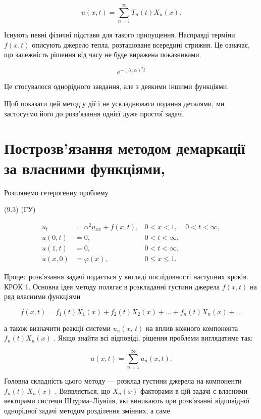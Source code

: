 \documentclass[
  ukrainian,
]{article}
\begin{document}
\[
u(x, t) = \sum_{n=1}^{\infty} T_n(t) X_n(x).
\]

Існують певні фізичні підстави для такого припущення. Насправді терміни
\(f(x,t)\) описують джерело тепла, розташоване всередині стрижня. Це
означає, що залежність рішення від часу не буде виражена показниками.

\[
e^{-(\lambda_n\alpha)^2 t}
\]

Це стосувалося однорідного завдання, але з деякими іншими функціями.

Щоб показати цей метод у дії і не ускладнювати подання деталями, ми
застосуємо його до розв'язання однієї дуже простої задачі.

\section{Построзв'язання методом демаркації за власними
функціями,}\label{ux43fux43eux441ux442ux440ux43eux437ux432ux44fux437ux430ux43dux43dux44f-ux43cux435ux442ux43eux434ux43eux43c-ux434ux435ux43cux430ux440ux43aux430ux446ux456ux457-ux437ux430-ux432ux43bux430ux441ux43dux438ux43cux438-ux444ux443ux43dux43aux446ux456ux44fux43cux438}

Розглянемо гетерогенну проблему

(9.3) (ГУ)

\[
\begin{aligned} u_t &= \alpha^2 u_{xx} + f(x, t), & 0 < x < 1, & 0 < t < \infty, \\ u(0, t) &= 0, & 0 < t < \infty, \\ u(1, t) &= 0, & 0 < t < \infty, \\ u(x, 0) &= \varphi(x), & 0 \leqslant x \leqslant 1. \end{aligned}
\]

Процес розв'язання задачі подається у вигляді послідовності наступних
кроків. КРОК 1. Основна ідея методу полягає в розкладанні густини
джерела \(f(x, t)\) на ряд власними функціями

\[
f(x, t) = f_1(t) X_1(x) + f_2(t) X_2(x) + \dots + f_n(t) X_n(x) + \dots
\]

а також визначити реакції системи \(u_n\left(x,\,t\right)\) на вплив
кожного компонента \(f_n\left(t\right)X_n\left(x\right)\) . Якщо знайти
всі відповіді, рішення проблеми виглядатиме так:

\[
u(x, t) = \sum_{n=1}^{\infty} u_n(x, t).
\]

Головна складність цього методу --- розклад густини джерела на
компоненти \(f_n(t)\,X_n(x)\) . Виявляється, що \(X_n(x)\) факторами в
цій задачі є власними векторами системи Штурма--Ліувіля, які виникають
при розв'язанні відповідної однорідної задачі методом розділення
змінних, а саме
\end{document}
